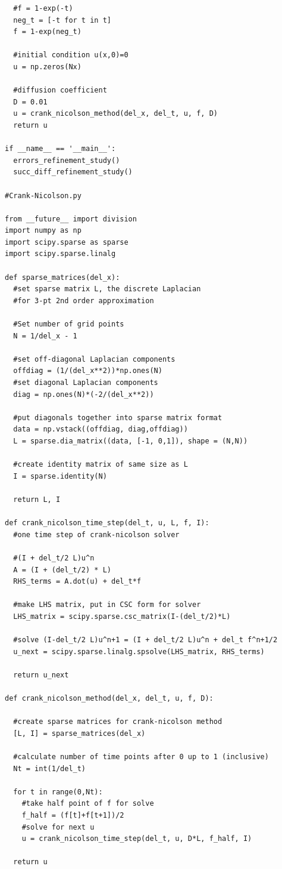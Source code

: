\documentclass[12pt]{article}
\begin{document}
\begin{verbatim}
  #f = 1-exp(-t)
  neg_t = [-t for t in t] 
  f = 1-exp(neg_t)
  
  #initial condition u(x,0)=0
  u = np.zeros(Nx)

  #diffusion coefficient
  D = 0.01
  u = crank_nicolson_method(del_x, del_t, u, f, D)
  return u  

if __name__ == '__main__':
  errors_refinement_study()
  succ_diff_refinement_study()

#Crank-Nicolson.py

from __future__ import division
import numpy as np
import scipy.sparse as sparse
import scipy.sparse.linalg

def sparse_matrices(del_x):
  #set sparse matrix L, the discrete Laplacian
  #for 3-pt 2nd order approximation

  #Set number of grid points
  N = 1/del_x - 1

  #set off-diagonal Laplacian components
  offdiag = (1/(del_x**2))*np.ones(N)
  #set diagonal Laplacian components
  diag = np.ones(N)*(-2/(del_x**2))

  #put diagonals together into sparse matrix format
  data = np.vstack((offdiag, diag,offdiag))
  L = sparse.dia_matrix((data, [-1, 0,1]), shape = (N,N))

  #create identity matrix of same size as L
  I = sparse.identity(N)

  return L, I

def crank_nicolson_time_step(del_t, u, L, f, I):
  #one time step of crank-nicolson solver

  #(I + del_t/2 L)u^n
  A = (I + (del_t/2) * L)
  RHS_terms = A.dot(u) + del_t*f

  #make LHS matrix, put in CSC form for solver
  LHS_matrix = scipy.sparse.csc_matrix(I-(del_t/2)*L)

  #solve (I-del_t/2 L)u^n+1 = (I + del_t/2 L)u^n + del_t f^n+1/2
  u_next = scipy.sparse.linalg.spsolve(LHS_matrix, RHS_terms)

  return u_next

def crank_nicolson_method(del_x, del_t, u, f, D):

  #create sparse matrices for crank-nicolson method
  [L, I] = sparse_matrices(del_x)

  #calculate number of time points after 0 up to 1 (inclusive)
  Nt = int(1/del_t)

  for t in range(0,Nt):
    #take half point of f for solve
    f_half = (f[t]+f[t+1])/2
    #solve for next u
    u = crank_nicolson_time_step(del_t, u, D*L, f_half, I)
    
  return u
\end{verbatim}
\end{document}
